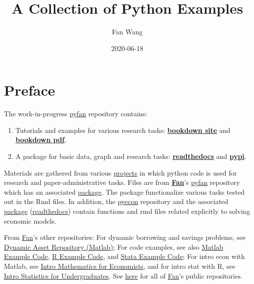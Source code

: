 \documentclass[
]{book}
\title{A Collection of Python Examples}
\author{Fan Wang}
\date{2020-06-18}
\providecommand{\tightlist}{%
  \setlength{\itemsep}{0pt}\setlength{\parskip}{0pt}}
\begin{document}
\maketitle

{
\hypersetup{linkcolor=}
\setcounter{tocdepth}{2}
\tableofcontents
}
\hypertarget{preface}{%
\chapter*{Preface}\label{preface}}

The work-in-progress \href{https://github.com/FanWangEcon/pyfan}{pyfan} repository contains:

\begin{enumerate}
\def\labelenumi{\arabic{enumi}.}
\tightlist
\item
  Tutorials and examples for various research tasks: \href{https://fanwangecon.github.io/pyfan/bookdown}{\textbf{bookdown site}} and \href{https://fanwangecon.github.io/pyfan/bookdown/A-Collection-of-Python-Examples.pdf}{\textbf{bookdown pdf}}.
\item
  A package for basic data, graph and research tasks: \href{https://pyfan.readthedocs.io/en/latest/}{\textbf{readthedocs}} and \href{https://pypi.org/project/pyfan/}{\textbf{pypi}}.
\end{enumerate}

Materials are gathered from various \href{https://fanwangecon.github.io/research}{projects} in which python code is used for research and paper-administrative tasks. Files are from \href{https://fanwangecon.github.io/}{\textbf{Fan}}'s \href{https://github.com/FanWangEcon/pyfan}{pyfan} repository which has an associated \href{https://pypi.org/project/pyfan/}{package}. The package functionalize various tasks tested out in the Rmd files. In addition, the \href{https://github.com/FanWangEcon/pyecon}{pyecon} repository and the associated \href{https://pypi.org/project/pyecon/}{package} (\href{https://pyfan.readthedocs.io/en/latest/autoapi/pyfan/index.html\#module-pyfan}{readthedocs}) contain functions and rmd files related explicitly to solving economic models.

From \href{https://fanwangecon.github.io/}{Fan}'s other repositories: For dynamic borrowing and savings problems, see \href{https://fanwangecon.github.io/CodeDynaAsset/}{Dynamic Asset Repository (Matlab)}; For code examples, see also \href{https://fanwangecon.github.io/M4Econ/}{Matlab Example Code}, \href{https://fanwangecon.github.io/R4Econ/}{R Example Code}, and \href{https://fanwangecon.github.io/Stata4Econ/}{Stata Example Code}; For intro econ with Matlab, see \href{https://fanwangecon.github.io/Math4Econ/}{Intro Mathematics for Economists}, and for intro stat with R, see \href{https://fanwangecon.github.io/Stat4Econ/}{Intro Statistics for Undergraduates}. See \href{https://github.com/FanWangEcon}{here} for all of \href{https://fanwangecon.github.io/}{Fan}'s public repositories.
\end{document}
